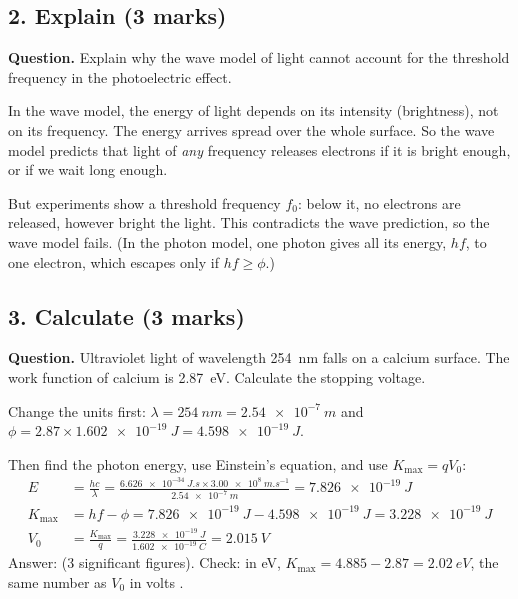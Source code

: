 \subsection*{2. Explain (3 marks)}
\textbf{Question.} Explain why the wave model of light cannot account for the threshold
frequency in the photoelectric effect.

\begin{modelanswer}
In the wave model, the energy of light depends on its intensity (brightness), not on its
frequency. The energy arrives spread over the whole surface. So the wave model predicts that light
of \emph{any} frequency releases electrons if it is bright enough, or if we wait long enough.

But experiments show a threshold frequency $f_0$: below it, no electrons are released, however
bright the light. This contradicts the wave prediction, so the wave model fails. (In the photon
model, one photon gives all its energy, $hf$, to one electron, which escapes only if
$hf \ge \phi$.)
\end{modelanswer}
\begin{markingcriteria}
\end{markingcriteria}

\subsection*{3. Calculate (3 marks)}
\textbf{Question.} Ultraviolet light of wavelength \qty{254}{nm} falls on a calcium surface.
The work function of calcium is \qty{2.87}{eV}. Calculate the stopping voltage.

\begin{modelanswer}
Change the units first: $\lambda = \qty{254}{nm} = \qty{2.54e-7}{m}$ and
$\phi = 2.87 \times \qty{1.602e-19}{J} = \qty{4.598e-19}{J}$.\par
Then find the photon energy, use Einstein's equation, and use $K_\mathrm{max} = qV_0$:
\begin{align*}
  E &= \frac{hc}{\lambda} = \frac{\qty{6.626e-34}{J.s} \times \qty{3.00e8}{m.s^{-1}}}
       {\qty{2.54e-7}{m}} = \qty{7.826e-19}{J}\\
  K_\mathrm{max} &= hf - \phi = \qty{7.826e-19}{J} - \qty{4.598e-19}{J} = \qty{3.228e-19}{J}\\
  V_0 &= \frac{K_\mathrm{max}}{q} = \frac{\qty{3.228e-19}{J}}{\qty{1.602e-19}{C}}
       = \qty{2.015}{V}
\end{align*}
Answer:  (3 significant figures). Check: in eV,
$K_\mathrm{max} = 4.885 - 2.87 = \qty{2.02}{eV}$, the same number as $V_0$ in volts \cmark.
\end{modelanswer}
\begin{markingcriteria}
\end{markingcriteria}

